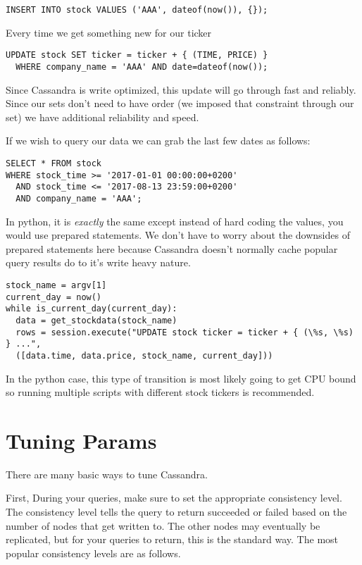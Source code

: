 \documentclass[9pt,twocolumn,twoside]{idsi}
\begin{document}
\begin{lstlisting}[breaklines]
INSERT INTO stock VALUES ('AAA', dateof(now()), {});
\end{lstlisting}

Every time we get something new for our ticker

\begin{lstlisting}[breaklines]
UPDATE stock SET ticker = ticker + { (TIME, PRICE) } 
  WHERE company_name = 'AAA' AND date=dateof(now());
\end{lstlisting}

Since Cassandra is write optimized, this update will go through fast and reliably. Since our sets don't need to have order (we imposed that constraint through our set) we have additional reliability and speed.

If we wish to query our data we can grab the last few dates as follows:

\begin{lstlisting}[breaklines]
SELECT * FROM stock 
WHERE stock_time >= '2017-01-01 00:00:00+0200' 
  AND stock_time <= '2017-08-13 23:59:00+0200'
  AND company_name = 'AAA';
\end{lstlisting}

In python, it is \textit{exactly} the same except instead of hard coding the values, you would use prepared statements. We don't have to worry about the downsides of prepared statements here because Cassandra doesn't normally cache popular query results do to it's write heavy nature.

\begin{lstlisting}[breaklines]
stock_name = argv[1]
current_day = now()
while is_current_day(current_day):
  data = get_stockdata(stock_name)
  rows = session.execute("UPDATE stock ticker = ticker + { (\%s, \%s) } ...", 
  ([data.time, data.price, stock_name, current_day]))
\end{lstlisting}

In the python case, this type of transition is most likely going to get CPU bound so running multiple scripts with different stock tickers is recommended.

\section{Tuning Params}

There are many basic ways to tune Cassandra.

First, During your queries, make sure to set the appropriate consistency level. The consistency level tells the query to return succeeded or failed based on the number of nodes that get written to. The other nodes may eventually be replicated, but for your queries to return, this is the standard way. The most popular consistency levels are as follows.
\end{document}
